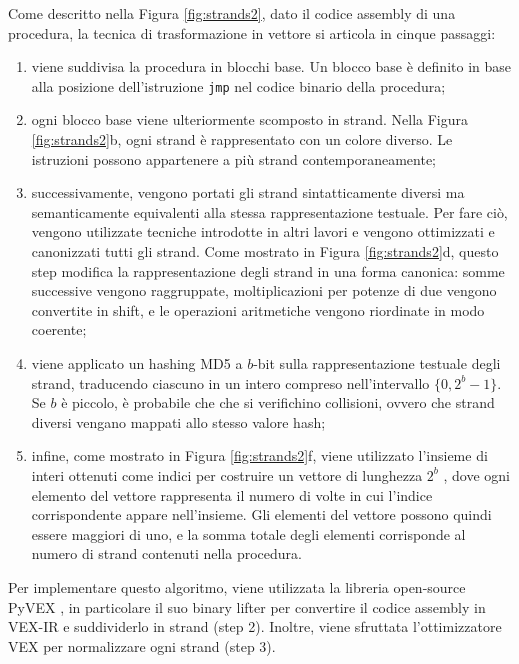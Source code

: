\documentclass[12pt,a4paper,openright,twoside]{report}
\begin{document}
Come descritto nella Figura \ref{fig:strands2}, dato il codice assembly di una procedura, la tecnica di trasformazione in vettore si articola in cinque passaggi:
\begin{enumerate}
    \item viene suddivisa la procedura in blocchi base. Un blocco base è definito in base alla posizione dell'istruzione \texttt{jmp} nel codice binario della procedura;
    \item ogni blocco base viene ulteriormente scomposto in strand. Nella Figura \ref{fig:strands2}b, ogni strand è rappresentato con un colore diverso. Le istruzioni possono appartenere a più strand contemporaneamente;
    \item successivamente, vengono portati gli strand sintatticamente diversi ma semanticamente equivalenti alla stessa rappresentazione testuale. Per fare ciò, vengono utilizzate tecniche introdotte in altri lavori e vengono ottimizzati e canonizzati tutti gli strand. Come mostrato in Figura \ref{fig:strands2}d, questo step modifica la rappresentazione degli strand in una forma canonica: somme successive vengono raggruppate, moltiplicazioni per potenze di due vengono convertite in shift, e le operazioni aritmetiche vengono riordinate in modo coerente;
    \item viene applicato un hashing MD5 a $b$-bit sulla rappresentazione testuale degli strand, traducendo ciascuno in un intero compreso nell'intervallo $\{ 0, 2^b - 1 \}$. Se $b$ è piccolo, è probabile che che si verifichino collisioni, ovvero che strand diversi vengano mappati allo stesso valore hash;
    \item infine, come mostrato in Figura \ref{fig:strands2}f, viene utilizzato l'insieme di interi ottenuti come indici per costruire un vettore di lunghezza $2^b$ , dove ogni elemento del vettore rappresenta il numero di volte in cui l'indice corrispondente appare nell'insieme. Gli elementi del vettore possono quindi essere maggiori di uno, e la somma totale degli elementi corrisponde al numero di strand contenuti nella procedura.
\end{enumerate}
Per implementare questo algoritmo, viene utilizzata la libreria open-source PyVEX \cite{pyvex}, in particolare il suo binary lifter per convertire il codice assembly in VEX-IR e suddividerlo in strand (step 2). Inoltre, viene sfruttata l’ottimizzatore VEX per normalizzare ogni strand (step 3).
\end{document}

